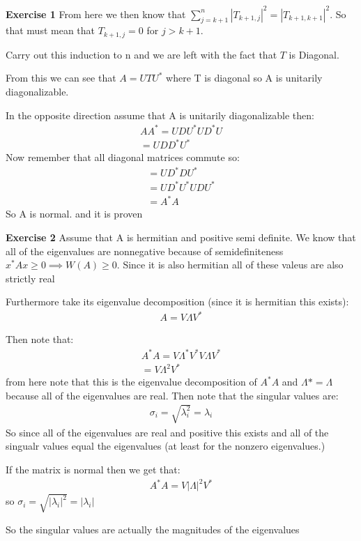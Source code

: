 \documentclass[12pt]{article}
\newenvironment{exercise}[1]{\vspace{.1in}\noindent\textbf{Exercise #1 \hspace{.05em}}}{}
\theoremstyle{definition}
\theoremstyle{remark}
\begin{document}
\begin{exercise}{1}
	From here we then know that $\sum_{j=k+1}^n|T_{k+1,j}|^2=|T_{k+1,k+1}|^2$. So that must mean that $T_{k+1,j}=0$ for $j>k+1$.

	Carry out this induction to n and we are left with the fact that $T$ is Diagonal.

	From this we can see that $A=UTU^*$ where T is diagonal so A is unitarily diagonalizable.

	In the opposite direction assume that A is unitarily diagonalizable then:
	\begin{align}
		AA^*=UDU^*UD^*U \\
		=UDD^*U^*
	\end{align}
	Now remember that all diagonal matrices commute so:
	\begin{align}
		=UD^*DU^*     \\
		=UD^*U^*UDU^* \\
		=A^*A
	\end{align}
	So A is normal. and it is proven

\end{exercise}

\begin{exercise}{2}
	Assume that A is hermitian and positive semi definite. We know that all of the eigenvalues are nonnegative because of semidefiniteness $x^*Ax\geq0\implies W(A)\geq0$. Since it is also hermitian all of these valeus are also strictly real

	Furthermore take its eigenvalue decomposition (since it is hermitian this exists):
	\begin{align}
		A=V\Lambda V^*
	\end{align}

	Then note that:
	\begin{align}
		A^*A=V\Lambda^* V^*V\Lambda V^* \\
		=V\Lambda^2 V^*
	\end{align}
	from here note that this is the eigenvalue decomposition of $A^*A$ and $\Lambda*=\Lambda$ because all of the eigenvalues are real. Then note that the singular values are:
	\begin{align}
		\sigma_i= \sqrt{\lambda_i^2}=\lambda_i
	\end{align}
	So since all of the eigenvalues are real and positive this exists and all of the singualr values equal the eigenvalues (at least for the nonzero eigenvalues.)

	If the matrix is normal then we get that:
	\begin{align}
		A^*A=V|\Lambda|^2V^*
	\end{align}
	so $\sigma_i = \sqrt{|\lambda_i|^2}=|\lambda_i|$

	So the singular values are actually the magnitudes of the eigenvalues
\end{exercise}
\end{document}
